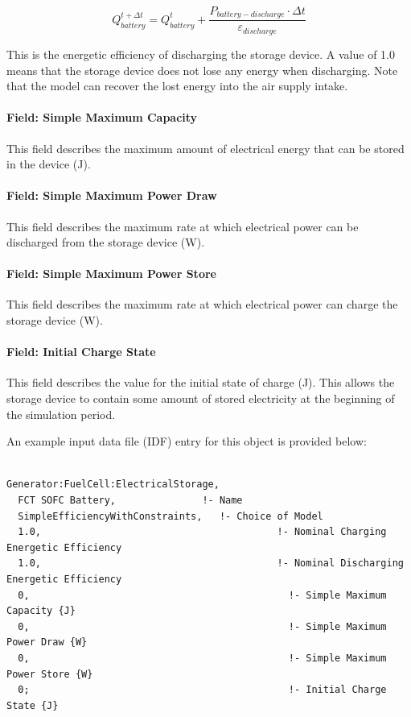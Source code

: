 \begin{equation}
Q_{battery}^{t + \Delta t} = Q_{battery}^t + \frac{{{P_{battery - discharge}} \cdot \Delta t}}{{{\varepsilon_{discharge}}}}
\end{equation}

This is the energetic efficiency of discharging the storage device. A value of 1.0 means that the storage device does not lose any energy when discharging. Note that the model can recover the lost energy into the air supply intake.

\paragraph{Field: Simple Maximum Capacity}\label{field-simple-maximum-capacity}

This field describes the maximum amount of electrical energy that can be stored in the device (J).

\paragraph{Field: Simple Maximum Power Draw}\label{field-simple-maximum-power-draw}

This field describes the maximum rate at which electrical power can be discharged from the storage device (W).

\paragraph{Field: Simple Maximum Power Store}\label{field-simple-maximum-power-store}

This field describes the maximum rate at which electrical power can charge the storage device (W).

\paragraph{Field: Initial Charge State}\label{field-initial-charge-state}

This field describes the value for the initial state of charge (J). This allows the storage device to contain some amount of stored electricity at the beginning of the simulation period.

An example input data file (IDF) entry for this object is provided below:

\begin{lstlisting}

Generator:FuelCell:ElectricalStorage,
  FCT SOFC Battery,               !- Name
  SimpleEfficiencyWithConstraints,   !- Choice of Model
  1.0,                                         !- Nominal Charging Energetic Efficiency
  1.0,                                         !- Nominal Discharging Energetic Efficiency
  0,                                             !- Simple Maximum Capacity {J}
  0,                                             !- Simple Maximum Power Draw {W}
  0,                                             !- Simple Maximum Power Store {W}
  0;                                             !- Initial Charge State {J}
\end{lstlisting}

